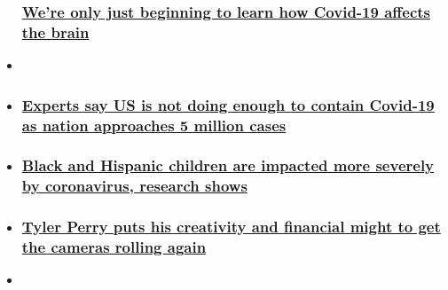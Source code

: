 \begin{itemize}
{  \subsubsection{\texorpdfstring{\href{/2020/07/29/health/covid-19-brain-effects-wellness/index.html}{We're
  only just beginning to learn how Covid-19 affects the
  brain}}{We're only just beginning to learn how Covid-19 affects the brain}}\label{were-only-just-beginning-to-learn-how-covid-19-affects-the-brain}}
\item
\end{itemize}

\begin{itemize}
\item
  \hypertarget{experts-say-us-is-not-doing-enough-to-contain-covid-19-as-nation-approaches-5-million-cases}{%
  \subsubsection{\texorpdfstring{\href{/2020/08/08/health/us-coronavirus-saturday/index.html}{Experts
  say US is not doing enough to contain Covid-19 as nation approaches 5
  million
  cases}}{Experts say US is not doing enough to contain Covid-19 as nation approaches 5 million cases}}\label{experts-say-us-is-not-doing-enough-to-contain-covid-19-as-nation-approaches-5-million-cases}}
\item
  \hypertarget{black-and-hispanic-children-are-impacted-more-severely-by-coronavirus-research-shows-}{%
  \subsubsection{\texorpdfstring{\href{/2020/08/08/health/cdc-black-hispanic-children-coronavirus/index.html}{Black
  and Hispanic children are impacted more severely by coronavirus,
  research shows
  }}{Black and Hispanic children are impacted more severely by coronavirus, research shows }}\label{black-and-hispanic-children-are-impacted-more-severely-by-coronavirus-research-shows-}}
\item
  \hypertarget{tyler-perry-puts-his-creativity-and-financial-might-to-get-the-cameras-rolling-again}{%
  \subsubsection{\texorpdfstring{\href{/2020/08/08/health/tyler-perry-camp-quarantine-sistas/index.html}{Tyler
  Perry puts his creativity and financial might to get the cameras
  rolling
  again}}{Tyler Perry puts his creativity and financial might to get the cameras rolling again}}\label{tyler-perry-puts-his-creativity-and-financial-might-to-get-the-cameras-rolling-again}}
\item
  \hypertarget{dr-sanjay-gupta-answers-kids-coronavirus-questions}{%
}
\end{itemize}
